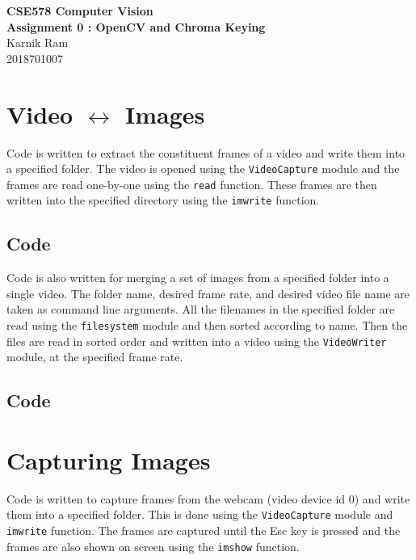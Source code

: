 \documentclass[a4paper,11pt]{article}
\begin{document}
 \begin{center}
  \Large{\textbf{CSE578 Computer Vision}}\\
  \large{\textbf{Assignment 0 : OpenCV and Chroma Keying}}\\
  \vspace{1em}
  Karnik Ram\\
  2018701007
 \end{center}
 
 \section{Video $\leftrightarrow$ Images}
  Code is written to extract the constituent frames of a video and write them into a specified folder. The video is opened using the \texttt{VideoCapture} module and the frames are read one-by-one using the \texttt{read} function. These frames are then written into the specified directory using the \texttt{imwrite} function.
  \subsection{Code}
  
  
  \vspace{1em}
  Code is also written for merging a set of images from a specified folder into a single video. The folder name, desired frame rate, and desired video file name are taken as command line arguments. All the filenames in the specified folder are read using the \texttt{filesystem} module and then sorted according to name. Then the files are read in sorted order and written into a video using the \texttt{VideoWriter} module, at the specified frame rate. \\
  
  \subsection{Code}
  
  \vspace{2em}

 \section{Capturing Images}
  Code is written to capture frames from the webcam (video device id 0) and write them into a specified folder. This is done using the \texttt{VideoCapture} module and \texttt{imwrite} function. The frames are captured until the Esc key is pressed and the frames are also shown on screen using the \texttt{imshow} function.
  
\end{document}
